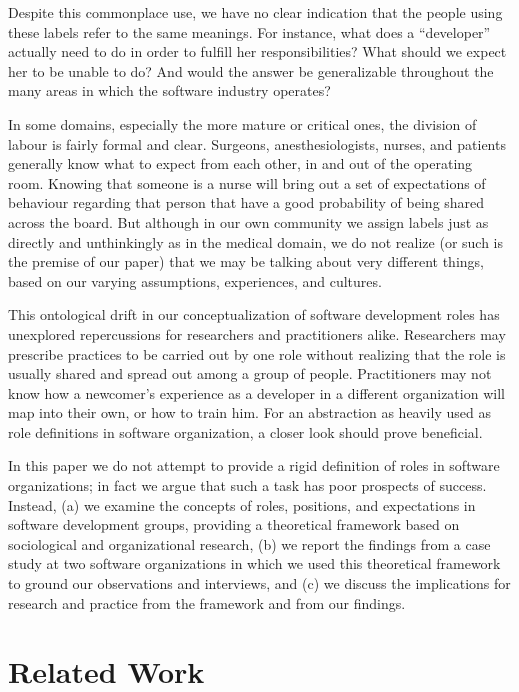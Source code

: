 \documentclass[10pt, conference, compsocconf]{IEEEtran}
\begin{document}
Despite this commonplace use, we have no clear indication that the people using these labels refer to the same meanings. For instance, what does a ``developer'' actually need to do in order to fulfill her responsibilities? What should we expect her to be unable to do? And would the answer be generalizable throughout the many areas in which the software industry operates?

In some domains, especially the more mature or critical ones, the division of labour is fairly formal and clear. Surgeons, anesthesiologists, nurses, and patients generally know what to expect from each other, in and out of the operating room. Knowing that someone is a nurse will bring out a set of expectations of behaviour regarding that person that have a good probability of being shared across the board. But although in our own community we assign labels just as directly and unthinkingly as in the medical domain, we do not realize (or such is the premise of our paper) that we may be talking about very different things, based on our varying assumptions, experiences, and cultures.

This ontological drift \cite{Robinson1991} in our conceptualization of software development roles has unexplored repercussions for researchers and practitioners alike. Researchers may prescribe practices to be carried out by one role without realizing that the role is usually shared and spread out among a group of people. Practitioners may not know how a newcomer's experience as a developer in a different organization will map into their own, or how to train him. For an abstraction as heavily used as role definitions in software organization, a closer look should prove beneficial.

In this paper we do not attempt to provide a rigid definition of roles in software organizations; in fact we argue that such a task has poor prospects of success. Instead, (a) we examine the concepts of roles, positions, and expectations in software development groups, providing a theoretical framework based on sociological and organizational research, (b) we report the findings from a case study at two software organizations in which we used this theoretical framework to ground our observations and interviews, and (c) we discuss the implications for research and practice from the framework and from our findings.




\section{Related Work}
\end{document}

